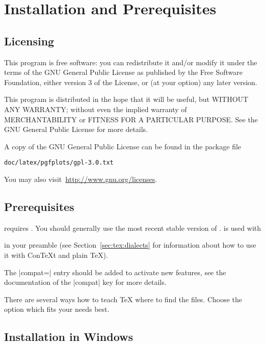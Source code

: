 
\section{Installation and Prerequisites}

\subsection{Licensing}

This program is free software: you can redistribute it and/or modify it under
the terms of the GNU General Public License as published by the Free Software
Foundation, either version 3 of the License, or (at your option) any later
version.

This program is distributed in the hope that it will be useful, but WITHOUT ANY
WARRANTY; without even the implied warranty of MERCHANTABILITY or FITNESS FOR A
PARTICULAR PURPOSE.  See the GNU General Public License for more details.

A copy of the GNU General Public License can be found in the package file
%
\begin{verbatim}
doc/latex/pgfplots/gpl-3.0.txt
\end{verbatim}
%
You may also visit~\url{http://www.gnu.org/licenses}.


\subsection{Prerequisites}

\PGFPlots{} requires \PGF{}. You should generally use the most recent stable
version of \PGF{}. \PGFPlots{} is used with
%

%
\noindent in your preamble (see Section~\ref{sec:tex:dialects} for information
about how to use it with Con\TeX{}t and plain \TeX{}).

The |compat=| entry should be added to activate new features,
see the documentation of the |compat| key for more details.



There are several ways how to teach \TeX{} where to find the files. Choose the
option which fits your needs best.


\subsection{Installation in Windows}

